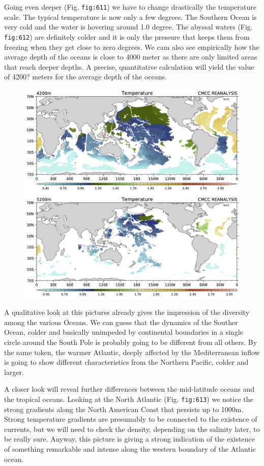 Going even deeper (Fig. \texttt{fig:611}) we have to change drastically
the temperature scale. The typical temperature is now only a few
degrees. The Southern Ocean is very cold and the water is hovering
around 1.0 degree. The abyssal waters (Fig. \texttt{fig:612}) are
definitely colder and it is only the pressure that keeps them from
freezing when they get close to zero degrees. We cam also see
empirically how the average depth of the oceans is close to 4000 meter
as there are only limited areas that reach deeper depths. A precise,
quantitative calculation will yield the value of 4200? meters for the
average depth of the oceans.

\begin{figure}
	\centering
	\includegraphics[width = .7 \textwidth]{figs/GD/Temp4200-5200.png}
	\caption{} \label{fig:}
\end{figure}

A qualitative look at this pictures already gives the impression of the
diversity among the various Oceans. We can guess that the dynamics of
the Souther Ocean, colder and basically unimpeded by continental
boundaries in a single circle around the South Pole is probably going to
be different from all others. By the same token, the warmer Atlantic,
deeply affected by the Mediterranean inflow is going to show different
characteristics from the Northern Pacific, colder and larger.

A closer look will reveal further differences between the mid-latitude
oceans and the tropical oceans. Looking at the North Atlantic (Fig.
\texttt{fig:613}) we notice the strong gradients along the North
American Coast that persists up to 1000m. Strong temperature gradients
are presumably to be connected to the existence of currents, but we will
need to check the density, depending on the salinity later, to be really
sure. Anyway, this picture is giving a strong indication of the
existence of something remarkable and intense along the western boundary
of the Atlantic ocean.

